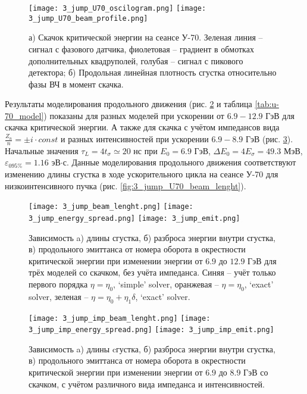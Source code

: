 \begin{figure}
   \texttt{[image: 3\_jump\_U70\_oscilogram.png]}
   \texttt{[image: 3\_jump\_U70\_beam\_profile.png]}
   \caption{а) Скачок критической энергии на сеансе У-70. Зеленая линия – сигнал с фазового датчика, фиолетовая – градиент в обмотках дополнительных квадруполей, голубая – сигнал с пикового детектора; б) Продольная линейная плотность сгустка относительно фазы ВЧ в момент скачка.}
   \label{fig:3_jump_U70_oscilogram}
\end{figure}

\par Результаты моделирования продольного движения (рис. \ref{fig:3_jump} и таблица \ref{tab:u-70_model}) показаны для разных моделей при ускорении от $6.9-12.9$ ГэВ для скачка критической энергии. А также для скачка с учётом импедансов вида $\frac{Z_n}{n}=\pm i\cdot const$ и разных интенсивностей при ускорении $6.9-8.9$ ГэВ (рис. \ref{fig:3_jump_imp}). Начальные значения $\tau_L=4t_\sigma\simeq20$ нс при $E_0=6.9$ ГэВ, $\Delta E_{0} = 4E_{\sigma} =49.3$ МэВ, $\varepsilon_{0 95\%}=1.16$ эВ$\cdot$с. Данные моделирования продольного движения соответствуют изменению длины сгустка в ходе ускорительного цикла на сеансе У-70 для низкоинтенсивного пучка (рис. \ref{fig:3_jump_U70_beam_lenght}).

\begin{figure}
   \texttt{[image: 3\_jump\_beam\_lenght.png]}
   \texttt{[image: 3\_jump\_energy\_spread.png]}
   \texttt{[image: 3\_jump\_emit.png]}
   \caption{Зависимость a) длины сгустка, б) разброса энергии внутри сгустка, в) продольного эмиттанса от номера оборота в окрестности критической энергии при изменении энергии от $6.9$ до $12.9$ ГэВ для трёх моделей со скачком, без учёта импеданса. Синяя – учёт только первого порядка $\eta=\eta_0$, ‘simple’ solver, оранжевая – $\eta=\eta_0$, ‘exact’ solver, зеленая – $\eta=\eta_0+\eta_1\delta$, ‘exact’ solver.}
   \label{fig:3_jump}
\end{figure}

\begin{figure}
   \texttt{[image: 3\_jump\_imp\_beam\_lenght.png]}
   \texttt{[image: 3\_jump\_imp\_energy\_spread.png]}
   \texttt{[image: 3\_jump\_imp\_emit.png]}
   \caption{Зависимость a) длины cгустка, б) разброса энергии внутри сгустка, в) продольного эмиттанса от номера оборота в окрестности критической энергии при изменении энергии от $6.9$ до $8.9$ ГэВ со скачком, с учётом различного вида импеданса и интенсивностей.}
   \label{fig:3_jump_imp}
\end{figure}

